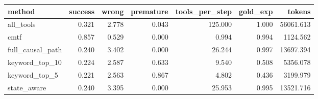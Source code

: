 \begin{tabular}{lrrrrrr}
\toprule
method & success & wrong & premature & tools_per_step & gold_exp & tokens \\
\midrule
all_tools & 0.321 & 2.778 & 0.043 & 125.000 & 1.000 & 56061.613 \\
cmtf & 0.857 & 0.529 & 0.000 & 0.994 & 0.994 & 1124.562 \\
full_causal_path & 0.240 & 3.402 & 0.000 & 26.244 & 0.997 & 13697.394 \\
keyword_top_10 & 0.224 & 2.587 & 0.633 & 9.540 & 0.508 & 5356.078 \\
keyword_top_5 & 0.221 & 2.563 & 0.867 & 4.802 & 0.436 & 3199.979 \\
state_aware & 0.240 & 3.395 & 0.000 & 25.953 & 0.995 & 13521.716 \\
\bottomrule
\end{tabular}
